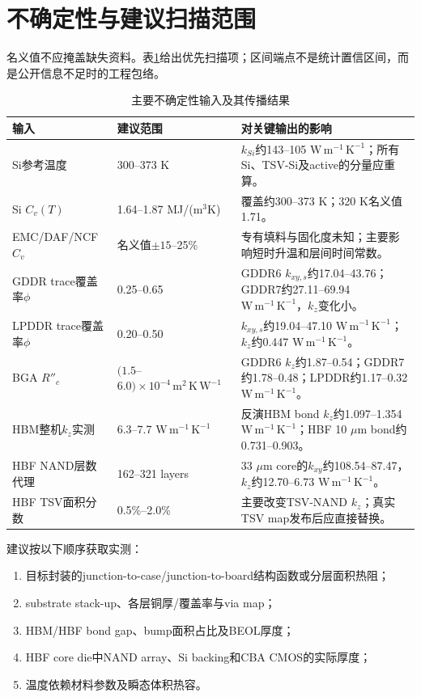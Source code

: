 \documentclass[UTF8,zihao=-4]{ctexart}
\newcommand{\unitk}{\mathrm{W\,m^{-1}\,K^{-1}}}
\newcommand{\unitr}{\mathrm{m^2\,K\,W^{-1}}}
\begin{document}
\section{不确定性与建议扫描范围}

名义值不应掩盖缺失资料。表\ref{tab:sensitivity}给出优先扫描项；区间端点不是统计置信区间，而是公开信息不足时的工程包络。

\begin{table}[H]
\centering
\caption{主要不确定性输入及其传播结果}
\label{tab:sensitivity}
\small
\begin{tabularx}{\textwidth}{p{3.4cm}p{3.6cm}X}
\toprule
输入 & 建议范围 & 对关键输出的影响 \\
\midrule
Si参考温度 & 300--373 K & $k_{Si}$约143--105 $\unitk$；所有Si、TSV-Si及active的分量应重算。\\
Si $C_v(T)$ & 1.64--1.87 MJ/(m$^3$K) & 覆盖约300--373 K；320 K名义值1.71。\\
EMC/DAF/NCF $C_v$ & 名义值$\pm15$--25\% & 专有填料与固化度未知；主要影响短时升温和层间时间常数。\\
GDDR trace覆盖率$\phi$ & 0.25--0.65 & GDDR6 $k_{xy,s}$约17.04--43.76；GDDR7约27.11--69.94 $\unitk$，$k_z$变化小。\\
LPDDR trace覆盖率$\phi$ & 0.20--0.50 & $k_{xy,s}$约19.04--47.10 $\unitk$；$k_z$约0.447 $\unitk$。\\
BGA $R''_c$ & $(1.5$--$6.0)\times10^{-4}\,\unitr$ & GDDR6 $k_z$约1.87--0.54；GDDR7约1.78--0.48；LPDDR约1.17--0.32 $\unitk$。\\
HBM整机$k_z$实测 & 6.3--7.7 $\unitk$ & 反演HBM bond $k_z$约1.097--1.354 $\unitk$；HBF 10 $\mu\mathrm{m}$ bond约0.731--0.903。\\
HBF NAND层数代理 & 162--321 layers & 33 $\mu\mathrm{m}$ core的$k_{xy}$约108.54--87.47，$k_z$约12.70--6.73 $\unitk$。\\
HBF TSV面积分数 & 0.5\%--2.0\% & 主要改变TSV-NAND $k_z$；真实TSV map发布后应直接替换。\\
\bottomrule
\end{tabularx}
\end{table}

建议按以下顺序获取实测：
\begin{enumerate}
  \item 目标封装的junction-to-case/junction-to-board结构函数或分层面积热阻；
  \item substrate stack-up、各层铜厚/覆盖率与via map；
  \item HBM/HBF bond gap、bump面积占比及BEOL厚度；
  \item HBF core die中NAND array、Si backing和CBA CMOS的实际厚度；
  \item 温度依赖材料参数及瞬态体积热容。
\end{enumerate}
\end{document}

